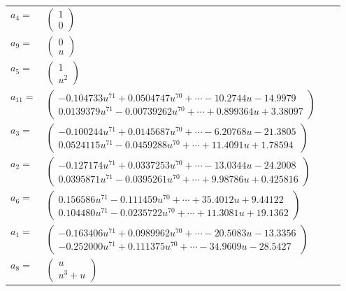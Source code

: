 \documentclass[1p]{elsarticle_modified}
\theoremstyle{definition}
\begin{document}
\begin{tabular}{m{7pt} m{180pt} m{7pt} m{180pt} }
\flushright $a_{4}=$&$\begin{pmatrix}1\\0\end{pmatrix}$ \\
\flushright $a_{9}=$&$\begin{pmatrix}0\\u\end{pmatrix}$ \\
\flushright $a_{5}=$&$\begin{pmatrix}1\\u^2\end{pmatrix}$ \\
\flushright $a_{11}=$&$\begin{pmatrix}-0.104733 u^{71}+0.0504747 u^{70}+\cdots-10.2744 u-14.9979\\0.0139379 u^{71}-0.00739262 u^{70}+\cdots+0.899364 u+3.38097\end{pmatrix}$ \\
\flushright $a_{3}=$&$\begin{pmatrix}-0.100244 u^{71}+0.0145687 u^{70}+\cdots-6.20768 u-21.3805\\0.0524115 u^{71}-0.0459288 u^{70}+\cdots+11.4091 u+1.78594\end{pmatrix}$ \\
\flushright $a_{2}=$&$\begin{pmatrix}-0.127174 u^{71}+0.0337253 u^{70}+\cdots-13.0344 u-24.2008\\0.0395871 u^{71}-0.0395261 u^{70}+\cdots+9.98786 u+0.425816\end{pmatrix}$ \\
\flushright $a_{6}=$&$\begin{pmatrix}0.156586 u^{71}-0.111459 u^{70}+\cdots+35.4012 u+9.44122\\0.104480 u^{71}-0.0235722 u^{70}+\cdots+11.3081 u+19.1362\end{pmatrix}$ \\
\flushright $a_{1}=$&$\begin{pmatrix}-0.163406 u^{71}+0.0989962 u^{70}+\cdots-20.5083 u-13.3356\\-0.252000 u^{71}+0.111375 u^{70}+\cdots-34.9609 u-28.5427\end{pmatrix}$ \\
\flushright $a_{8}=$&$\begin{pmatrix}u\\u^3+u\end{pmatrix}$ \\

\end{tabular}
\end{document}
